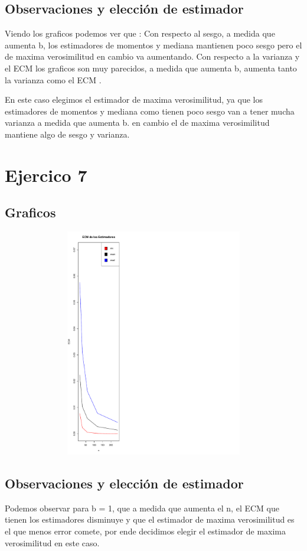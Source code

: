 \documentclass[a4paper]{article}
\begin{document}
\subsection{Observaciones y elección de estimador}
Viendo los graficos podemos ver que : \newline
Con respecto al sesgo, a medida que aumenta b, los estimadores de momentos y mediana mantienen poco sesgo pero el de maxima verosimilitud en cambio va aumentando. \newline
Con respecto a la varianza y el ECM los graficos son muy parecidos, a medida que aumenta b, aumenta tanto la varianza como el ECM . \newline

En este caso elegimos el estimador de maxima verosimilitud, ya que los estimadores de momentos y mediana como tienen poco sesgo van a tener mucha varianza a medida que aumenta b. en cambio el de maxima verosimilitud mantiene algo de sesgo y varianza.

\section{Ejercico 7}
\subsection{Graficos}
\begin{figure}[H]
	\centering
	\includegraphics[width=15cm, height=10cm]{Ejercicio-7-plot}
\end{figure}

\subsection{Observaciones y elección de estimador}
Podemos observar para b = 1, que a medida que aumenta el n, el ECM  que tienen los estimadores disminuye y que el estimador de maxima verosimilitud es el que menos error comete, por ende decidimos elegir el estimador de maxima verosimilitud en este caso.   
\end{document}
